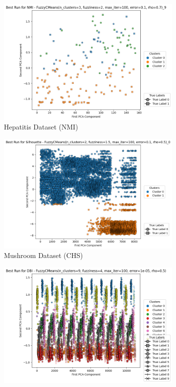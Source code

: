 \begin{figure}[H]
	\centering
	\begin{subfigure}{0.32\textwidth}
		\centering
		\includegraphics[width=\linewidth]{figures/FuzzyCMeans/Hepatitis/best_run_NMI.png}
		\caption{Hepatitis Dataset (NMI)}
	\end{subfigure}
	\hfill
	\begin{subfigure}{0.32\textwidth}
		\centering
		\includegraphics[width=\linewidth]{figures/FuzzyCMeans/Mushroom/best_run_Silhouette.png}
		\caption{Mushroom Dataset (CHS)}
	\end{subfigure}
	\hfill
	\begin{subfigure}{0.32\textwidth}
		\centering
		\includegraphics[width=\linewidth]{figures/FuzzyCMeans/PenBased/best_run_DBI.png}

\end{subfigure}
\end{figure}
